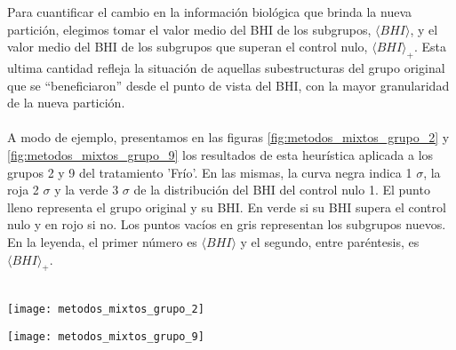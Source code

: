 Para cuantificar el cambio en la información biológica que brinda la nueva partición, elegimos tomar el valor medio del BHI de los subgrupos, $\langle BHI \rangle$, y el valor medio del BHI de los subgrupos que superan el control nulo, $\langle BHI \rangle _{+}$. Esta ultima cantidad refleja la situación de aquellas subestructuras del grupo original que se ``beneficiaron'' desde el punto de vista del BHI, con la mayor granularidad de la nueva partición.\\\\
A modo de ejemplo, presentamos en las figuras \ref{fig:metodos_mixtos_grupo_2} y \ref{fig:metodos_mixtos_grupo_9} los resultados de esta heurística aplicada a los grupos 2 y 9 del tratamiento 'Frío'. En las mismas, la curva negra indica 1 $\sigma$, la roja 2 $\sigma$ y la verde 3 $\sigma$ de la distribución del BHI del control nulo 1. El punto lleno representa el grupo original y su BHI. En verde si su BHI supera el control nulo y en rojo si no. Los puntos vacíos en gris representan los subgrupos nuevos. En la leyenda, el primer número es $\langle BHI \rangle$ y el segundo, entre paréntesis, es $\langle BHI \rangle _{+}$.\\\\
\clearpage
\begin{sidewaysfigure}[H]
 \centering
\texttt{[image: metodos\_mixtos\_grupo\_2]}
\label{fig:metodos_mixtos_grupo_2}
\end{sidewaysfigure}

\begin{sidewaysfigure}[H]
 \centering
\texttt{[image: metodos\_mixtos\_grupo\_9]}
\label{fig:metodos_mixtos_grupo_9}
\end{sidewaysfigure}

